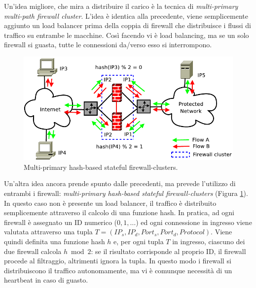 Un'idea migliore, che mira a distribuire il carico è la tecnica di \textit{multi-primary multi-path firewall cluster}. L'idea è identica alla precedente, viene semplicemente aggiunto un load balancer prima della coppia di firewall che distribuisce i flussi di traffico su entrambe le macchine. Così facendo vi è load balancing, ma se un solo firewall si guasta, tutte le connessioni da/verso esso si interrompono.
\begin{figure}[htbp]
	\centering
	\includegraphics[scale = 0.35]{images/multi-primary-hash-based-stateful-firewall-clusters}
	\caption{Multi-primary hash-based stateful firewall-clusters.}
	\label{img:multi-primary-hash-based-stateful-firewall-clusters}
\end{figure}

Un'altra idea ancora prende spunto dalle precedenti, ma prevede l'utilizzo di entrambi i firewall: \textit{multi-primary hash-based stateful firewall-clusters} (Figura \ref{img:multi-primary-hash-based-stateful-firewall-clusters}). In questo caso non è presente un load balancer, il traffico è distribuito semplicemente attraverso il calcolo di una funzione hash. In pratica, ad ogni firewall è assegnato un ID numerico ($0,1,\dots$) ed ogni connessione in ingresso viene valutata attraverso una tupla $T = (IP_s, IP_d, Port_s, Port_d, Protocol)$. Viene quindi definita una funzione hash $h$ e, per ogni tupla $T$ in ingresso, ciascuno dei due firewall calcola $h\bmod 2$: se il risultato corrisponde al proprio ID, il firewall procede al filtraggio, altrimenti ignora la tupla. In questo modo i firewall si distribuiscono il traffico autonomamente, ma vi è comunque necessità di un heartbeat in caso di guasto.

